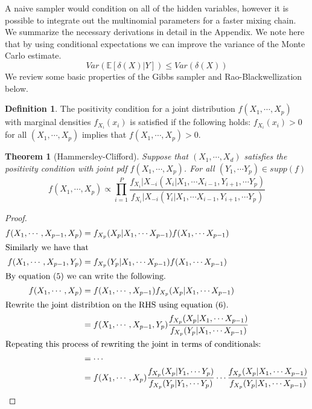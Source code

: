 \documentclass{article}%
\newtheorem{theorem}{Theorem}[section]
\theoremstyle{definition}
\newtheorem{definition}{Definition}[section]
\begin{document}
A naive sampler would condition on all of the hidden variables, however it is possible to integrate out the multinomial parameters for a faster mixing chain. We summarize the necessary derivations in detail in the Appendix. We note here that by using conditional expectations we can improve the variance of the Monte Carlo estimate. 
\begin{equation}
    Var(\mathbb{E}[\delta(X)|Y]) \leq Var(\delta(X))
\end{equation}
We review some basic properties of the Gibbs sampler and Rao-Blackwellization below. %
\nocite{Robert:2005:MCS:1051451}
\begin{definition}
The positivity condition for a joint distribution $f(X_1,\cdots, X_p)$ with marginal densities $f_{X_i}(x_i)$ is satisfied if the following holds: $f_{X_i}(x_i) > 0$ for all $(X_1,\cdots, X_p)$ implies that $f(X_1,\cdots, X_p) > 0$.
\end{definition}
\begin{theorem}[Hammersley-Clifford]
\label{thm:hc}
Suppose that $(X_1,\cdots,X_d)$ satisfies the positivity condition with joint pdf $f(X_1,\cdots, X_p)$. For all $(Y_1, \cdots Y_p) \in supp(f)$
\begin{equation}
f(X_1,\cdots, X_p) \propto \prod\limits_{i=1}^{P} \frac{f_{X_i} | X_{-i}(X_i | X_1, \cdots X_{i-1}, Y_{i+1}, \cdots Y_p)}{f_{X_i} | X_{-i}(Y_i | X_1, \cdots X_{i-1}, Y_{i+1}, \cdots Y_p)}
\end{equation}
\end{theorem}
\begin{proof}
\begin{align}
    f(X_1, \cdots, X_{p-1}, X_p) &= f_{X_p}(X_p | X_1, \cdots X_{p-1})f(X_1, \cdots X_{p-1}) \\
\intertext{Similarly we have that}
    f(X_1, \cdots, X_{p-1}, Y_p) &= f_{X_p}(Y_p | X_1, \cdots X_{p-1})f(X_1, \cdots X_{p-1}) \\
\intertext{By equation (5) we can write the following.}
    f(X_1,\cdots, X_p) &= f(X_1,\cdots, X_{p-1}) f_{X_p}(X_p | X_1, \cdots X_{p-1})\\
\intertext{Rewrite the joint distribtion on the RHS using equation (6).}
    &= f(X_1,\cdots, X_{p-1}, Y_p) \frac{f_{X_p}(X_p | X_1, \cdots X_{p-1})}{f_{X_p}(Y_p | X_1, \cdots X_{p-1})}\\
\intertext{Repeating this process of rewriting the joint in terms of conditionals:}
&= \cdots \\
&= f(X_1,\cdots, X_p)\frac{f_{X_p}(X_p | Y_1, \cdots Y_p)}{f_{X_p}(Y_p | Y_1, \cdots Y_{p})} \cdots \frac{f_{X_p}(X_p | X_1, \cdots X_{p-1})}{f_{X_p}(Y_p | X_1, \cdots X_{p-1})}
\end{align}
\end{proof}
\end{document}
